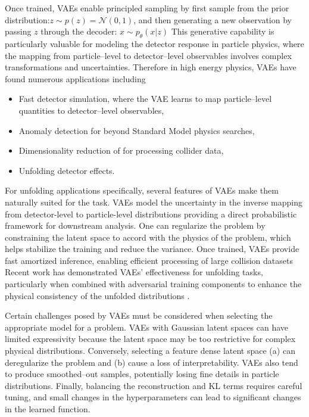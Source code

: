         Once trained, VAEs enable principled sampling by first sample from the prior distribution:\(z \sim p(z) = \mathcal{N}(0, 1)\), and then generating a new observation by passing \(z\) through the decoder: \(x \sim p_{\theta}(x|z)\)
        This generative capability is particularly valuable for modeling the detector response in particle physics, where the mapping from particle--level to detector--level observables involves complex transformations and uncertainties.
        Therefore in high energy physics, VAEs have found numerous applications including
        \begin{itemize}
            \item Fast detector simulation, where the VAE learns to map particle--level quantities to detector--level observables, 
            \item Anomaly detection for beyond Standard Model physics searches,
            \item Dimensionality reduction of for processing collider data, 
            \item Unfolding detector effects.
        \end{itemize}
        For unfolding applications specifically, several features of VAEs make them naturally suited for the task.
        VAEs model the uncertainty in the inverse mapping from detector-level to particle-level distributions providing a direct probabilistic framework for downstream analysis.
        One can regularize the problem by constraining the latent space to accord with the physics of the problem, which helps stabilize the training and reduce the variance.
        Once trained, VAEs provide fast amortized inference, enabling efficient processing of large collision datasets
        Recent work has demonstrated VAEs' effectiveness for unfolding tasks, particularly when combined with adversarial training components to enhance the physical consistency of the unfolded distributions .

        Certain challenges posed by VAEs must be considered when selecting the appropriate model for a problem.
        VAEs with Gaussian latent spaces can have limited expressivity because the latent space may be too restrictive for complex physical distributions.
        Conversely, selecting a feature dense latent space (a) can deregularize the problem and (b) cause a loss of interpretability.
        VAEs also tend to produce smoothed--out samples, potentially losing fine details in particle distributions.
        Finally, balancing the reconstruction and KL terms requires careful tuning, and small changes in the hyperparameters can lead to significant changes in the learned function.

